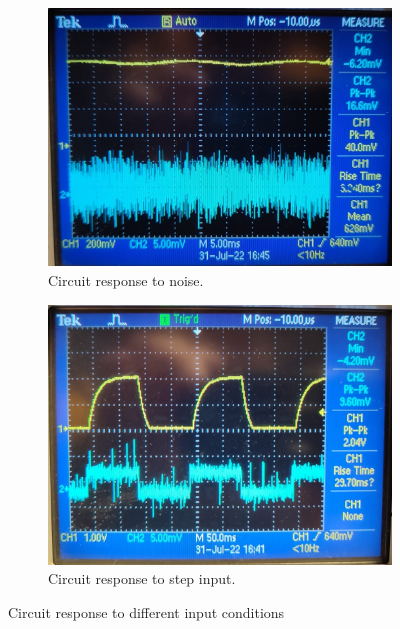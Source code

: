 \begin{figure}[H]
\begin{subfigure}[]{0.3\textwidth}
\includegraphics[width=\linewidth]{./Figures/CurSens_Prac_Noise.jpeg}
\caption{Circuit response to noise.}
\label{subfig:cursen_prac_noise}	
\end{subfigure}
\hfill
\begin{subfigure}[]{0.3\textwidth}
\includegraphics[width=\linewidth]{./Figures/CurSens_Prac_Step.jpeg}
\caption{Circuit response to step input.} 			
\label{subfig:cursen_prac_step}	
\end{subfigure}
\caption{Circuit response to different input conditions}
\label{fig:cursen_prac_resp}
\end{figure}

\newpage

